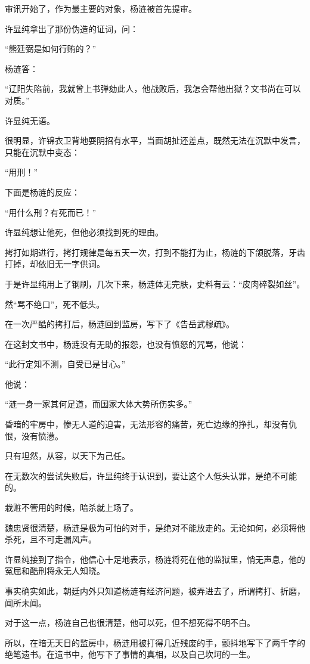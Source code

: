 \begin{multicols}{\theparacolNo}
		审讯开始了，作为最主要的对象，杨涟被首先提审。

		许显纯拿出了那份伪造的证词，问：

		“熊廷弼是如何行贿的？”

		杨涟答：

		“辽阳失陷前，我就曾上书弹劾此人，他战败后，我怎会帮他出狱？文书尚在可以对质。”

		许显纯无语。

		很明显，许锦衣卫背地耍阴招有水平，当面胡扯还差点，既然无法在沉默中发言，只能在沉默中变态：

		“用刑！”

		下面是杨涟的反应：

		“用什么刑？有死而已！”

		许显纯想让他死，但他必须找到死的理由。

		拷打如期进行，拷打规律是每五天一次，打到不能打为止，杨涟的下颌脱落，牙齿打掉，却依旧无一字供词。

		于是许显纯用上了钢刷，几次下来，杨涟体无完肤，史料有云：“皮肉碎裂如丝”。

		然“骂不绝口”，死不低头。

		在一次严酷的拷打后，杨涟回到监房，写下了《告岳武穆疏》。

		在这封文书中，杨涟没有无助的报怨，也没有愤怒的咒骂，他说：

		“此行定知不测，自受已是甘心。”

		他说：

		“涟一身一家其何足道，而国家大体大势所伤实多。”

		昏暗的牢房中，惨无人道的迫害，无法形容的痛苦，死亡边缘的挣扎，却没有仇恨，没有愤懑。

		只有坦然，从容，以天下为己任。

		在无数次的尝试失败后，许显纯终于认识到，要让这个人低头认罪，是绝不可能的。

		栽赃不管用的时候，暗杀就上场了。

		魏忠贤很清楚，杨涟是极为可怕的对手，是绝对不能放走的。无论如何，必须将他杀死，且不可走漏风声。

		许显纯接到了指令，他信心十足地表示，杨涟将死在他的监狱里，悄无声息，他的冤屈和酷刑将永无人知晓。

		事实确实如此，朝廷内外只知道杨涟有经济问题，被弄进去了，所谓拷打、折磨，闻所未闻。

		对于这一点，杨涟自己也很清楚，他可以死，但不想死得不明不白。

		所以，在暗无天日的监房中，杨涟用被打得几近残废的手，颤抖地写下了两千字的绝笔遗书。在遗书中，他写下了事情的真相，以及自己坎坷的一生。


\end{multicols}
